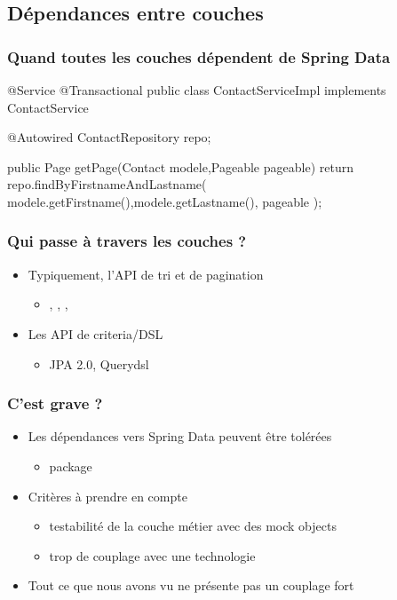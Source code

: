 \subsection{Dépendances entre couches}


\begin{frame}[fragile]
 \frametitle{Quand toutes les couches dépendent de Spring Data}

 \begin{javacode}
@Service
@Transactional
public class ContactServiceImpl implements ContactService {
 
  @Autowired ContactRepository repo;
  
  public Page getPage(Contact modele,Pageable pageable) {
    return repo.findByFirstnameAndLastname(
      modele.getFirstname(),modele.getLastname(),
      pageable
    );
  }

}
 \end{javacode}
\end{frame}

\begin{frame}
 \frametitle{Qui passe à travers les couches ?}

 \begin{itemize}
  \item Typiquement, l'API de tri et de pagination
  \begin{itemize}
   \item {}, , , 
  \end{itemize}
  \item Les API de criteria/DSL
  \begin{itemize}
   \item JPA 2.0, Querydsl
  \end{itemize}
 \end{itemize}
 
\end{frame}

\begin{frame}
 \frametitle{C'est grave ?}

 \begin{itemize}
  \item Les dépendances vers Spring Data peuvent être tolérées
  \begin{itemize}
   \item package 
  \end{itemize}
  \item Critères à prendre en compte 
  \begin{itemize}
   \item testabilité de la couche métier avec des mock objects
   \item trop de couplage avec une technologie
  \end{itemize}
  \item Tout ce que nous avons vu ne présente pas un couplage fort
 \end{itemize}
 
\end{frame}